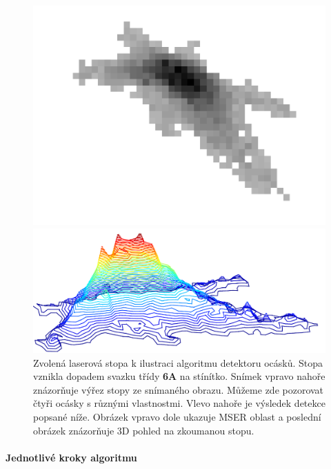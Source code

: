 \begin{figure}[htps]
\begin{minipage}[c]{0.4\textwidth}
	\includegraphics[width=\textwidth]{figures/tailex01.pdf}
	\end{minipage}
	\begin{minipage}[c]{0.4\textwidth}
	\includegraphics[width=\textwidth]{figures/tailex02.pdf}
	\end{minipage}
	
	\caption[Detektor ocásků - laserová stopa.]{Zvolená laserová stopa k ilustraci algoritmu detektoru ocásků. Stopa vznikla dopadem svazku třídy \textbf{6A} na stínítko.  Snímek vpravo nahoře znázorňuje výřez stopy ze snímaného obrazu. Můžeme zde pozorovat čtyři ocásky s různými vlastnostmi. Vlevo nahoře je výsledek detekce popsané níže. Obrázek vpravo dole ukazuje MSER oblast a poslední obrázek znázorňuje 3D pohled na zkoumanou stopu.}
	\label{fig:mark_tail}
	\end{figure}


\paragraph{Jednotlivé kroky algoritmu}

